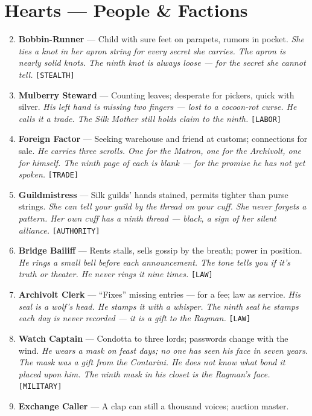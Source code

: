 \section*{Hearts --- People \& Factions}
\label{sec:silkstrand-people}
\begin{enumerate}
\setcounter{enumi}{1}
\item \textbf{Bobbin-Runner} --- Child with sure feet on parapets, rumors in pocket.
  \hfill \textit{She ties a knot in her apron string for every secret she carries. The apron is nearly solid knots. The ninth knot is always loose --- for the secret she cannot tell.} \texttt{[STEALTH]}
\item \textbf{Mulberry Steward} --- Counting leaves; desperate for pickers, quick with silver.
  \hfill \textit{His left hand is missing two fingers --- lost to a cocoon-rot curse. He calls it a trade. The Silk Mother still holds claim to the ninth.} \texttt{[LABOR]}
\item \textbf{Foreign Factor} --- Seeking warehouse and friend at customs; connections for sale.
  \hfill \textit{He carries three scrolls. One for the Matron, one for the Archivolt, one for himself. The ninth page of each is blank --- for the promise he has not yet spoken.} \texttt{[TRADE]}
\item \textbf{Guildmistress} --- Silk guilds' hands stained, permits tighter than purse strings.
  \hfill \textit{She can tell your guild by the thread on your cuff. She never forgets a pattern. Her own cuff has a ninth thread --- black, a sign of her silent alliance.} \texttt{[AUTHORITY]}
\item \textbf{Bridge Bailiff} --- Rents stalls, sells gossip by the breath; power in position.
  \hfill \textit{He rings a small bell before each announcement. The tone tells you if it's truth or theater. He never rings it nine times.} \texttt{[LAW]}
\item \textbf{Archivolt Clerk} --- ``Fixes'' missing entries --- for a fee; law as service.
  \hfill \textit{His seal is a wolf's head. He stamps it with a whisper. The ninth seal he stamps each day is never recorded --- it is a gift to the Ragman.} \texttt{[LAW]}
\item \textbf{Watch Captain} --- Condotta to three lords; passwords change with the wind.
  \hfill \textit{He wears a mask on feast days; no one has seen his face in seven years. The mask was a gift from the Contarini. He does not know what bond it placed upon him. The ninth mask in his closet is the Ragman's face.} \texttt{[MILITARY]}
\item \textbf{Exchange Caller} --- A clap can still a thousand voices; auction master.

\end{enumerate}
